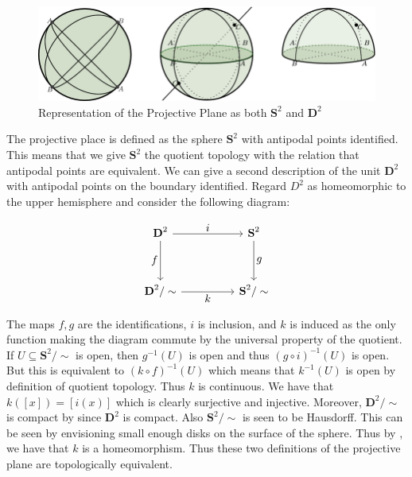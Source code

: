 \documentclass[letterpaper, 11pt, oneside]{book}
\begin{document}
\begin{ex}\
  \begin{figure}[h]
    \centering
    \includegraphics[width=\textwidth]{figs/Projective_Plane_Sphere_Disk.png}
    \caption{Representation of the Projective Plane as both $\textbf{S}^2$ and $\textbf{D}^{2}$~\cite{proj_plane_pic}}\label{fig:proj_plane}
    \nocite{proj_plane_pic}
  \end{figure}

  The projective place is defined as the sphere $\textbf{S}^{2}$ with antipodal points identified.
  This means that we give $\textbf{S}^{2}$ the quotient topology with the relation that antipodal points are equivalent.
  We can give a second description of the unit $\textbf{D}^{2}$ with antipodal points on the boundary identified.
  Regard $D^{2}$ as homeomorphic to the upper hemisphere and consider the following diagram:

  \begin{figure}[h]
    \centering
    \[
      \begin{tikzcd}[every label/.append style={font=\normalsize}]
        {\textbf{D}^2} && {\textbf{S}^2} \\
        \\
        {\textbf{D}^2/ \sim} && {\textbf{S}^2 / \sim}
        \arrow["i", from=1-1, to=1-3]
        \arrow["g", from=1-3, to=3-3]
        \arrow["k"', from=3-1, to=3-3]
        \arrow["f"', from=1-1, to=3-1]
      \end{tikzcd}
    \]
    \addtocounter{figure}{1}
  \end{figure}

  The maps $f, g$ are the identifications, $i$ is inclusion, and $k$ is induced as the only function making the diagram commute by the universal property of the quotient.
  If $U \subseteq \textbf{S}^{2} / \sim$ is open, then $g^{-1}(U)$ is open and thus $(g \circ i)^{-1}(U)$ is open.
  But this is equivalent to $(k \circ f)^{-1}(U)$ which means that $k^{-1}(U)$ is open by definition of quotient topology.
  Thus $k$ is continuous.
  We have that $k([x]) = [i(x)]$ which is clearly surjective and injective.
  Moreover, $\textbf{D}^{2} / \sim$ is compact by  since $\textbf{D}^{2}$ is compact.
  Also $\textbf{S}^{2} / \sim$ is seen to be Hausdorff.
  This can be seen by envisioning small enough disks on the surface of the sphere.
  Thus by \Cref{thrm: bij_comp_to_Haus_is_homeo}, we have that $k$ is a homeomorphism.
  Thus these two definitions of the projective plane are topologically equivalent.
\end{ex}
\end{document}
